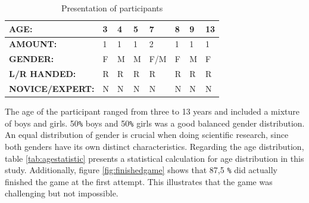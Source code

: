 \renewcommand{\arraystretch}{1.5}
 \begin{table}[h]
     \centering
     \begin{tabular}{c|c|c|c|c|c|c|c}
     \hline
        \multicolumn{1}{|l|}{\textbf{AGE:}}  &
        \multicolumn{1}{l|}{3}  &     
        \multicolumn{1}{l|}{4}  & 
        \multicolumn{1}{l|}{5}  & 
        \multicolumn{1}{l|}{7}  & 
        \multicolumn{1}{l|}{8}  & 
        \multicolumn{1}{l|}{9}  & 
        \multicolumn{1}{l|}{13} \\ \hline
        \multicolumn{1}{|l|}{\textbf{AMOUNT:}} &
        \multicolumn{1}{l|}{1}  &
        \multicolumn{1}{l|}{1}  &
        \multicolumn{1}{l|}{1}  &
        \multicolumn{1}{l|}{2}  &
        \multicolumn{1}{l|}{1}  &
        \multicolumn{1}{l|}{1}  &
        \multicolumn{1}{l|}{1}  \\ \hline
        \multicolumn{1}{|l|}{\textbf{GENDER:}}  &
        \multicolumn{1}{|l|}{F} &
        \multicolumn{1}{l|}{M}  &
        \multicolumn{1}{l|}{M}  &
        \multicolumn{1}{l|}{F/M}&
        \multicolumn{1}{l|}{F}  &
        \multicolumn{1}{l|}{M}  &
        \multicolumn{1}{l|}{F}  \\ \hline
        \multicolumn{1}{|l|}{\textbf{L/R HANDED:}} &
        \multicolumn{1}{|l|}{R} &
        \multicolumn{1}{l|}{R}  &
        \multicolumn{1}{l|}{R}  &
        \multicolumn{1}{l|}{R}  &
        \multicolumn{1}{l|}{R}  &
        \multicolumn{1}{l|}{R}  &
        \multicolumn{1}{l|}{R}  \\ \hline
        \multicolumn{1}{|l|}{\textbf{NOVICE/EXPERT:}} &
        \multicolumn{1}{|l|}{N} &
        \multicolumn{1}{l|}{N}  &
        \multicolumn{1}{l|}{N}  &
        \multicolumn{1}{l|}{N}  &
        \multicolumn{1}{l|}{N}  &
        \multicolumn{1}{l|}{N}  &
        \multicolumn{1}{l|}{N}  \\ \hline
     \end{tabular}
     \caption{Presentation of participants}
     \label{tab:participanttable}
 \end{table}
 

The age of the participant ranged from three to 13 years and included a mixture of boys and girls. 50\texttt{\%} boys and 50\texttt{\%} girls was a good balanced gender distribution. An equal distribution of gender is crucial when doing scientific research, since both genders have its own distinct characteristics. Regarding the age distribution, table  \ref{tab:agestatistic} presents a statistical calculation for age distribution in this study.
Additionally, figure \ref{fig:finishedgame} shows that 87,5 \texttt{\%} did actually finished the game at the first attempt. This illustrates that the game was challenging but not impossible. 


